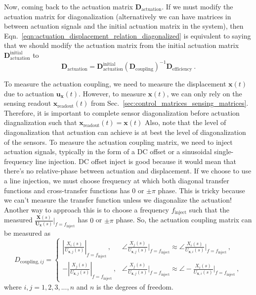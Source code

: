 Now, coming back to the actuation matrix $\mathbf{D}_\mathrm{actuation}$.
If we must modify the actuation matrix for diagonalization (alternatively we can have matrices in between actuation signals and the initial actuation matrix in the system), then Eqn.~\eqref{eqn:actuation_displacement_relation_diagonalized} is equivalent to saying that we should modify the actuation matrix from the initial actuation matrix $\mathbf{D}_\mathrm{actuation}^\mathrm{initial}$ to
\begin{equation}
	\boxed{
		\mathbf{D}_\mathrm{actuation} = \mathbf{D}_\mathrm{actuation}^\mathrm{initial} \left(\mathbf{D}_\mathrm{coupling}\right)^{-1} \mathbf{D}_\mathrm{efficiency}
	}\ .
	\label{eqn:actuation_matrix_diagonalized}
\end{equation}

To measure the actuation coupling, we need to measure the displacement $\mathbf{x}(t)$ due to actuation $\mathbf{u}_\mathbf{x}(t)$.
However, to measure $\mathbf{x}(t)$, we can only rely on the sensing readout $\mathbf{x}_\mathrm{readout}(t)$ from Sec.~\ref{sec:control_matrices_sensing_matrices}.
Therefore, it is important to complete sensor diagonalization before actuation diagnalization such that $\mathbf{x}_\mathrm{readout}(t)=\mathbf{x}(t)$
Also, note that the level of diagonalization that actuation can achieve is at best the level of diagonalization of the sensors.
To measure the actuation coupling matrix, we need to inject actuation signals, typically in the form of a DC offset or a sinusoidal single-frequency line injection.
DC offset inject is good because it would mean that there's no relative-phase between actuation and displacement.
If we choose to use a line injection, we must choose frequency at which both diagonal transfer functions and cross-transfer functions has $0$ or $\pm\pi$ phase.
This is tricky because we can't measure the transfer function unless we diagonalize the actuation!
Another way to approach this is to choose a frequency $f_\mathrm{inject}$ such that the measured $\frac{\mathbf{X}(s)}{\mathbf{U}_\mathbf{x}(s)}\big\rvert_{f=f_\mathrm{inject}}$ has $0$ or $\pm\pi$ phase.
So, the actuation coupling matrix can be measured as
\begin{equation}
	\boxed{
		D_{\mathrm{coupling}, ij} =
		\begin{cases}
			\left\lvert\frac{X_{i}(s)}{U_{\mathbf{x}, j}(s)}\right\rvert_{f=f_\mathrm{inject}}\,, & \angle\frac{X_{j}(s)}{U_{\mathbf{x}, j}(s)}\Big\rvert_{f=f_\mathrm{inject}} \approx \angle\frac{X_{i}(s)}{U_{\mathbf{x}, i}(s)}\Big\rvert_{f=f_\mathrm{inject}}\,,\\
			-\left\lvert\frac{X_{j}(s)}{U_{\mathbf{x}, j}(s)}\right\rvert_{f=f_\mathrm{inject}}\,, & \angle\frac{X_{j}(s)}{U_{\mathbf{x}, j}(s)}\Big\rvert_{f=f_\mathrm{inject}} \approx \angle -\frac{X_{i}(s)}{U_{\mathbf{x}, i}(s)}\Big\rvert_{f=f_\mathrm{inject}}\,,
		\end{cases}	
}
\end{equation}
where $i,j = 1,2,3,...,n$ and $n$ is the degrees of freedom.

